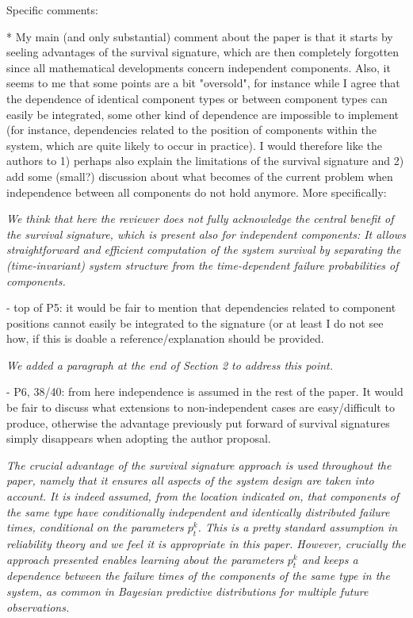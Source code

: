 \documentclass[12pt, a4paper]{elsarticle}
\begin{document}
Specific comments:

* My main (and only substantial) comment about the paper is that it starts by seeling advantages of the survival signature, which are then completely forgotten since all mathematical developments concern independent components. Also, it seems to me that some points are a bit "oversold", for instance while I agree that the dependence of identical component types or between component types can easily be integrated, some other kind of dependence are impossible to implement (for instance, dependencies related to the position of components within the system, which are quite likely to occur in practice). I would therefore like the authors to 1) perhaps also explain the limitations of the survival signature and 2) add some (small?) discussion about what becomes of the current problem when independence between all components do not hold anymore. More specifically:

\medskip
\emph{We think that here the reviewer does not fully acknowledge the central benefit of the survival signature,
which is present also for independent components:
It allows straightforward and efficient computation of the system survival by separating the (time-invariant) system structure from the time-dependent failure probabilities of components.}
\medskip

- top of P5: it would be fair to mention that dependencies related to component positions cannot easily be integrated to the signature (or at least I do not see how, if this is doable a reference/explanation should be provided.

\medskip
\emph{We added a paragraph at the end of Section 2 to address this point.}
\medskip

- P6, 38/40: from here independence is assumed in the rest of the paper. It would be fair to discuss what extensions to non-independent cases are easy/difficult to produce, otherwise the advantage previously put forward of survival signatures simply disappears when adopting the author proposal.
 
\medskip
\emph{The crucial advantage of the survival signature approach is used throughout the paper, namely that it ensures all aspects of the system design are taken into account. It is indeed assumed, from the location indicated on, that components of the same type have conditionally independent and identically distributed failure times, conditional on the parameters $p_t^k$. This is a pretty standard assumption in reliability theory and we feel it is appropriate in this paper. However, crucially the approach presented enables learning about the parameters $p_t^k$ and keeps a dependence between the failure times of the components of the same type in the system, as common in Bayesian predictive distributions for multiple future observations.}
\medskip
\end{document}

